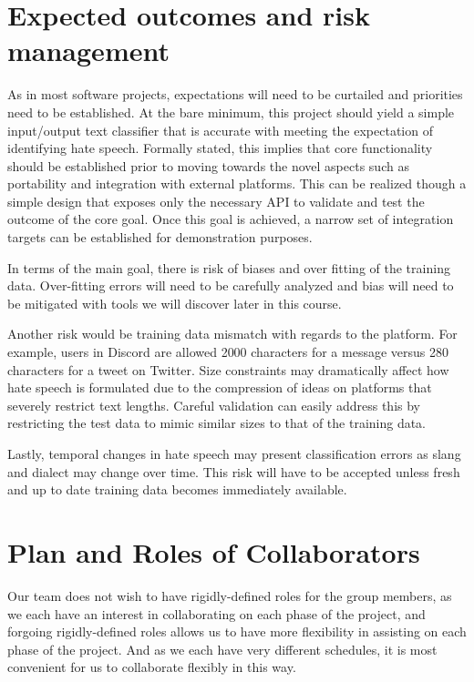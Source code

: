 \documentclass[conference]{sig-alternate-05-2015}
\begin{document}
\section{Expected outcomes and risk management}

As in most software projects, expectations will need to be curtailed and priorities need to be established.  At the bare minimum, this project should yield a simple input/output text classifier that is accurate with meeting the expectation of identifying hate speech.  Formally stated, this implies that core functionality should be established prior to moving towards the novel aspects such as portability and integration with external platforms.  This can be realized though a simple design that exposes only the necessary API to validate and test the outcome of the core goal.  Once this goal is achieved, a narrow set of integration targets can be established for demonstration purposes.

In terms of the main goal, there is risk of biases and over fitting of the training data.  Over-fitting errors will need to be carefully analyzed and bias will need to be mitigated with tools we will discover later in this course.

Another risk would be training data mismatch with regards to the platform.  For example, users in Discord are allowed 2000 characters for a message versus 280 characters for a tweet on Twitter.  Size constraints may dramatically affect how hate speech is formulated due to the compression of ideas on platforms that severely restrict text lengths.  Careful validation can easily address this by restricting the test data to mimic similar sizes to that of the training data.

Lastly, temporal changes in hate speech may present classification errors as slang and dialect may change over time.  This risk will have to be accepted unless fresh and up to date training data becomes immediately available.

\section{Plan and Roles of Collaborators}

Our team does not wish to have rigidly-defined roles for the group members, as we each have an interest in collaborating on each phase of the project, and forgoing rigidly-defined roles allows us to have more flexibility in assisting on each phase of the project. And as we each have very different schedules, it is most convenient for us to collaborate flexibly in this way.
\end{document}
